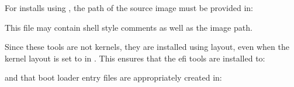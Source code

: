 \documentclass[letterpaper,11pt,english]{sphinxmanual}
\begin{document}
\sphinxAtStartPar
For installs using , the path of the source  image must be provided in:

\begin{sphinxVerbatim}[commandchars=\\\{\}]
\end{sphinxVerbatim}

\sphinxAtStartPar
This file may contain shell style comments as well as the image path.

\sphinxAtStartPar
Since these tools are not kernels, they are installed using  layout, even
when the kernel layout is set to  in . This ensures that
the efi tools are installed to:

\begin{sphinxVerbatim}[commandchars=\\\{\}]
\end{sphinxVerbatim}

\sphinxAtStartPar
and that boot loader entry files are appropriately created in:

\begin{sphinxVerbatim}[commandchars=\\\{\}]
\end{sphinxVerbatim}
\end{document}

